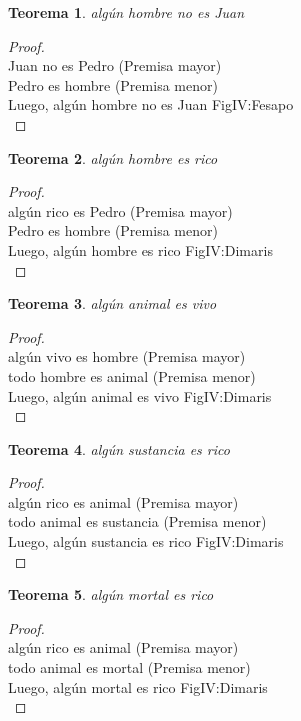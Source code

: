 ﻿\documentclass[12pt]{book}
\newtheorem{theorem}{Teorema}[chapter]
\newtheorem{proof}{Demostración}
\begin{document}
\begin{theorem}
algún hombre no es Juan
\label{th: 82}
\end{theorem}\begin{proof}\\Juan no es Pedro	 (Premisa mayor) \\Pedro es hombre	 (Premisa menor) \\Luego, algún hombre no es Juan	FigIV:Fesapo \\ \end{proof}
\begin{theorem}
algún hombre es rico
\label{th: 83}
\end{theorem}\begin{proof}\\algún rico es Pedro	 (Premisa mayor) \\Pedro es hombre	 (Premisa menor) \\Luego, algún hombre es rico	FigIV:Dimaris \\ \end{proof}
\begin{theorem}
algún animal es vivo
\label{th: 84}
\end{theorem}\begin{proof}\\algún vivo es hombre	 (Premisa mayor) \\todo hombre es animal	 (Premisa menor) \\Luego, algún animal es vivo	FigIV:Dimaris \\ \end{proof}
\begin{theorem}
algún sustancia es rico
\label{th: 85}
\end{theorem}\begin{proof}\\algún rico es animal	 (Premisa mayor) \\todo animal es sustancia	 (Premisa menor) \\Luego, algún sustancia es rico	FigIV:Dimaris \\ \end{proof}
\begin{theorem}
algún mortal es rico
\label{th: 86}
\end{theorem}\begin{proof}\\algún rico es animal	 (Premisa mayor) \\todo animal es mortal	 (Premisa menor) \\Luego, algún mortal es rico	FigIV:Dimaris \\ \end{proof}
\end{document}
